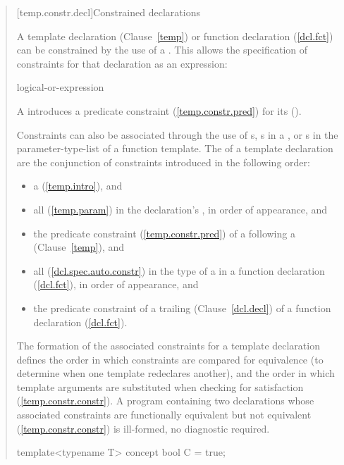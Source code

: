 \begin{quote}
[temp.constr.decl]{Constrained declarations}

\pnum
A template declaration (Clause~\ref{temp}) or function declaration 
(\ref{dcl.fct}) can be constrained by the use of a 
. 
% 
This allows the specification of constraints for that declaration as
an expression:

\begin{bnf}
\br
    logical-or-expression
\end{bnf}

A  introduces a predicate constraint
(\ref{temp.constr.pred}) for its 
().

\pnum
Constraints can also be associated through the use of 
s, 
s in a 
, or 
s in the parameter-type-list
of a function template.
% 
The  of a template declaration are 
the conjunction of constraints introduced in the following order:
% 
\begin{itemize}
\item a  (\ref{temp.intro}), 
      and

\item all  
      (\ref{temp.param}) in the declaration's 
      , in 
      order of appearance, and

\item the predicate constraint (\ref{temp.constr.pred}) 
      of a  following a 
       (Clause~\ref{temp}), and

\item all  
      (\ref{dcl.spec.auto.constr}) in the type of a 
       in a function declaration
      (\ref{dcl.fct}), in order of appearance, and

\item the predicate constraint of a trailing 
       (Clause~\ref{dcl.decl}) 
      of a function declaration (\ref{dcl.fct}).
\end{itemize}
% 
The formation of the associated constraints for a template declaration
defines the order in which constraints are compared for equivalence
(to determine when one template redeclares another), and the order in
which template arguments are substituted when checking for satisfaction
(\ref{temp.constr.constr}).
% 
A program containing two declarations whose associated constraints are 
functionally equivalent but not equivalent (\ref{temp.constr.constr}) is 
ill-formed, no diagnostic required.
% 
\enterexample
\begin{codeblock}
template<typename T> concept bool C = true;


\end{codeblock}
\end{quote}
